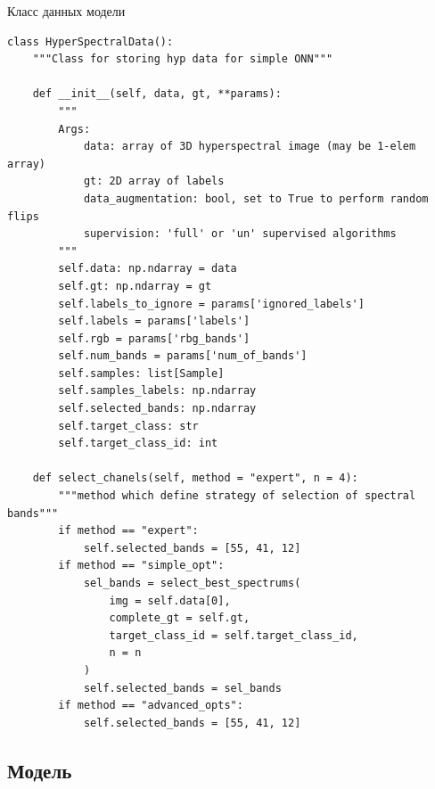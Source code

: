 \documentclass[14pt, russian]{scrartcl}
\begin{document}
\begin{listing}[H]
    \caption{Класс данных модели}
    \label{lst:hyp_data}
    \begin{verbatim}
class HyperSpectralData():
    """Class for storing hyp data for simple ONN"""

    def __init__(self, data, gt, **params):
        """
        Args:
            data: array of 3D hyperspectral image (may be 1-elem array)
            gt: 2D array of labels
            data_augmentation: bool, set to True to perform random flips
            supervision: 'full' or 'un' supervised algorithms
        """
        self.data: np.ndarray = data
        self.gt: np.ndarray = gt
        self.labels_to_ignore = params['ignored_labels']
        self.labels = params['labels']
        self.rgb = params['rbg_bands']
        self.num_bands = params['num_of_bands']
        self.samples: list[Sample]
        self.samples_labels: np.ndarray
        self.selected_bands: np.ndarray
        self.target_class: str
        self.target_class_id: int

    def select_chanels(self, method = "expert", n = 4):
        """method which define strategy of selection of spectral bands"""
        if method == "expert":
            self.selected_bands = [55, 41, 12]
        if method == "simple_opt":
            sel_bands = select_best_spectrums(
                img = self.data[0],
                complete_gt = self.gt,
                target_class_id = self.target_class_id,
                n = n
            )
            self.selected_bands = sel_bands
        if method == "advanced_opts":
            self.selected_bands = [55, 41, 12]
    \end{verbatim}
\end{listing}

\subsection{Модель}
\end{document}
